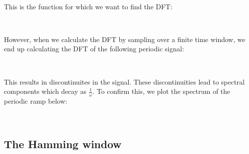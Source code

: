 \documentclass[11pt]{article}
\begin{document}
	

	

    \begin{center}
    \end{center}
    { \hspace*{\fill} \\}
    
	
		
    This is the function for which we want to find the DFT:

	

	

    \begin{center}
    \end{center}
    { \hspace*{\fill} \\}
    
	
		
    However, when we calculate the DFT by sampling over a finite time
window, we end up calculating the DFT of the following periodic signal:

	

	

    \begin{center}
    \end{center}
    { \hspace*{\fill} \\}
    
	
		
    This results in discontinuites in the signal. These discontinuities lead
to spectral components which decay as \(\frac{1}{\omega}\). To confirm
this, we plot the spectrum of the periodic ramp below:

	

	

    \begin{center}
    \end{center}
    { \hspace*{\fill} \\}
    
	
		
    \subsection{The Hamming window}\label{the-hamming-window}
\end{document}
